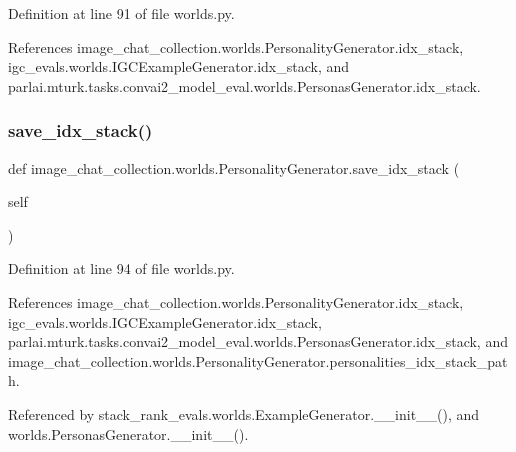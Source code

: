 Definition at line 91 of file worlds.\+py.



References image\+\_\+chat\+\_\+collection.\+worlds.\+Personality\+Generator.\+idx\+\_\+stack, igc\+\_\+evals.\+worlds.\+I\+G\+C\+Example\+Generator.\+idx\+\_\+stack, and parlai.\+mturk.\+tasks.\+convai2\+\_\+model\+\_\+eval.\+worlds.\+Personas\+Generator.\+idx\+\_\+stack.

\mbox{\label{classimage__chat__collection_1_1worlds_1_1PersonalityGenerator_a19645254b8da82832d6bcb0825119c65}} 
\subsubsection{\texorpdfstring{save\+\_\+idx\+\_\+stack()}{save\_idx\_stack()}}
{\footnotesize\ttfamily def image\+\_\+chat\+\_\+collection.\+worlds.\+Personality\+Generator.\+save\+\_\+idx\+\_\+stack (\begin{DoxyParamCaption}\item[{}]{self }\end{DoxyParamCaption})}



Definition at line 94 of file worlds.\+py.



References image\+\_\+chat\+\_\+collection.\+worlds.\+Personality\+Generator.\+idx\+\_\+stack, igc\+\_\+evals.\+worlds.\+I\+G\+C\+Example\+Generator.\+idx\+\_\+stack, parlai.\+mturk.\+tasks.\+convai2\+\_\+model\+\_\+eval.\+worlds.\+Personas\+Generator.\+idx\+\_\+stack, and image\+\_\+chat\+\_\+collection.\+worlds.\+Personality\+Generator.\+personalities\+\_\+idx\+\_\+stack\+\_\+path.



Referenced by stack\+\_\+rank\+\_\+evals.\+worlds.\+Example\+Generator.\+\_\+\+\_\+init\+\_\+\+\_\+(), and worlds.\+Personas\+Generator.\+\_\+\+\_\+init\+\_\+\+\_\+().

